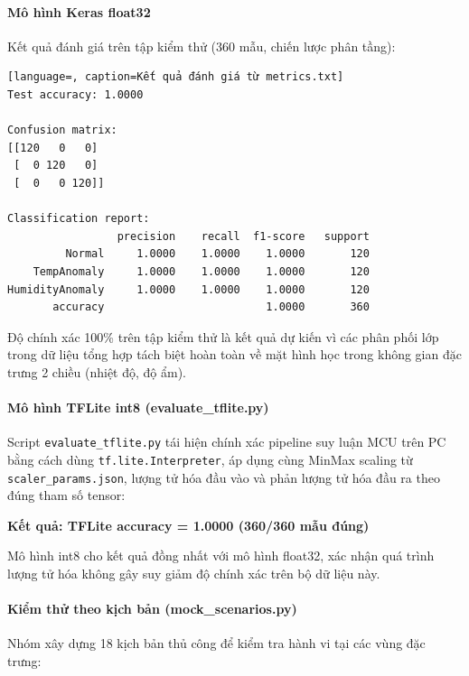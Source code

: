 \paragraph{Mô hình Keras float32}
Kết quả đánh giá trên tập kiểm thử (360 mẫu, chiến lược phân tầng):

\begin{lstlisting}[language=, caption=Kết quả đánh giá từ metrics.txt]
Test accuracy: 1.0000

Confusion matrix:
[[120   0   0]
 [  0 120   0]
 [  0   0 120]]

Classification report:
                 precision    recall  f1-score   support
         Normal     1.0000    1.0000    1.0000       120
    TempAnomaly     1.0000    1.0000    1.0000       120
HumidityAnomaly     1.0000    1.0000    1.0000       120
       accuracy                         1.0000       360
\end{lstlisting}

Độ chính xác 100\% trên tập kiểm thử là kết quả dự kiến vì các phân phối lớp trong dữ liệu tổng hợp tách biệt hoàn toàn về mặt hình học trong không gian đặc trưng 2 chiều (nhiệt độ, độ ẩm).

\paragraph{Mô hình TFLite int8 (evaluate\_tflite.py)}
Script \texttt{evaluate\_tflite.py} tái hiện chính xác pipeline suy luận MCU trên PC bằng cách dùng \texttt{tf.lite.Interpreter}, áp dụng cùng MinMax scaling từ \texttt{scaler\_params.json}, lượng tử hóa đầu vào và phản lượng tử hóa đầu ra theo đúng tham số tensor:

\begin{center}
\textbf{Kết quả: TFLite accuracy = 1.0000 (360/360 mẫu đúng)}
\end{center}

Mô hình int8 cho kết quả đồng nhất với mô hình float32, xác nhận quá trình lượng tử hóa không gây suy giảm độ chính xác trên bộ dữ liệu này.

\paragraph{Kiểm thử theo kịch bản (mock\_scenarios.py)}
Nhóm xây dựng 18 kịch bản thủ công để kiểm tra hành vi tại các vùng đặc trưng:

